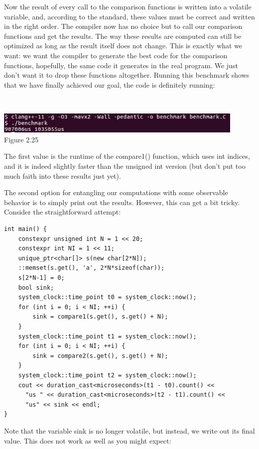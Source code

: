 Now the result of every call to the comparison functions is written into a volatile variable, and, according to the standard, these values must be correct and written in the right order. The compiler now has no choice but to call our comparison functions and get the results. The way these results are computed can still be optimized as long as the result itself does not change. This is exactly what we want: we want the compiler to generate the best code for the comparison functions, hopefully, the same code it generates in the real program. We just don't want it to drop these functions altogether. Running this benchmark shows that we have finally achieved our goal, the code is definitely running:

\hspace*{\fill} \\ %
\begin{center}
\includegraphics[width=0.9\textwidth]{content/1/chapter2/images/25.jpg}\\
Figure 2.25
\end{center}

The first value is the runtime of the compare1() function, which uses int indices, and it is indeed slightly faster than the unsigned int version (but don't put too much faith into these results just yet).

The second option for entangling our computations with some observable behavior is to simply print out the results. However, this can get a bit tricky. Consider the straightforward attempt:

\begin{lstlisting}[style=styleCXX]
int main() {
	constexpr unsigned int N = 1 << 20;
	constexpr int NI = 1 << 11;
	unique_ptr<char[]> s(new char[2*N]);
	::memset(s.get(), 'a', 2*N*sizeof(char));
	s[2*N-1] = 0;
	bool sink;
	system_clock::time_point t0 = system_clock::now();
	for (int i = 0; i < NI; ++i) {
		sink = compare1(s.get(), s.get() + N);
	}
	system_clock::time_point t1 = system_clock::now();
	for (int i = 0; i < NI; ++i) {
		sink = compare2(s.get(), s.get() + N);
	}
	system_clock::time_point t2 = system_clock::now();
	cout << duration_cast<microseconds>(t1 - t0).count() <<
	  "us " << duration_cast<microseconds>(t2 - t1).count() <<
	  "us" << sink << endl;
}
\end{lstlisting}

Note that the variable sink is no longer volatile, but instead, we write out its final value. This does not work as well as you might expect:

